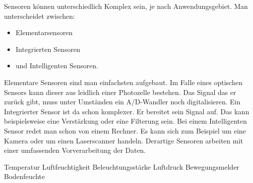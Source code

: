 Sensoren können unterschiedlich Komplex sein, je nach Anwendungsgebiet. Man unterscheidet zwischen:
\begin{itemize}
\item Elementarsensoren
\item Integrierten Sensoren
\item und Intelligenten Sensoren.
\end{itemize}

Elementare Sensoren sind man einfachsten aufgebaut. Im Falle eines optischen Sensors kann dieser aus leidlich einer Photozelle bestehen. Das Signal das er zurück gibt, muss unter Umständen ein A/D-Wandler noch digitalisieren. 
Ein Integrierter Sensor ist da schon komplexer. Er bereitet sein Signal auf. Das kann beispielsweise eine Verstärkung oder eine Filterung sein. Bei einem Intelligenten Sensor redet man schon von einem Rechner. Es kann sich zum Beispiel um eine Kamera oder um einen Laserscanner handeln. Derartige Sensoren arbeiten mit einer umfassenden Vorverarbeitung der Daten.


Temperatur
Luftfeuchtigkeit
Beleuchtungsstärke
Luftdruck
Bewegungsmelder
Bodenfeuchte

 
